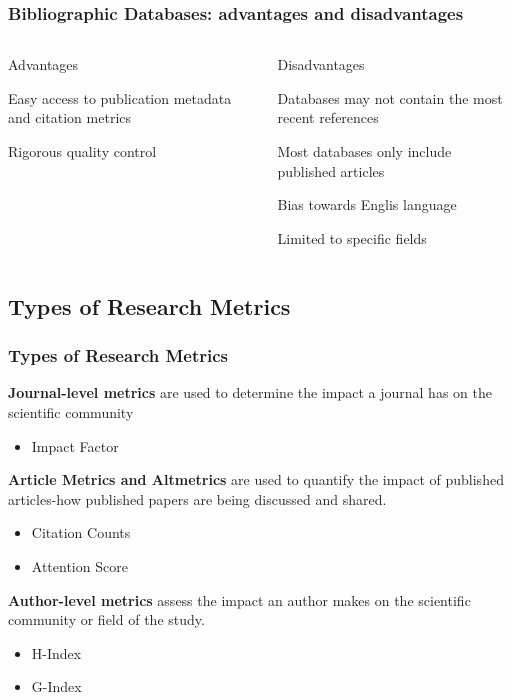 \documentclass{beamer}
\begin{document}
\begin{frame}
    \frametitle{Bibliographic Databases: advantages and disadvantages }
    \begin{columns}[T]
        \begin{column}{.5\textwidth}
            \centering Advantages
            \begin{propslist}
                \item Easy access to publication metadata and citation metrics
                \pause
                \item Rigorous quality control \pause
            \end{propslist}
        \end{column}
        \begin{column}{.5\textwidth}
            \centering Disadvantages %
            \begin{conslist}
                \item Databases may not contain the most recent references \pause
                \item Most databases only include published articles \pause
                \item Bias towards Englis language \pause
                \item Limited to specific fields \pause
            \end{conslist}
        \end{column}
    \end{columns}
\end{frame}
\subsection{Types of Research Metrics}
\begin{frame}
    \frametitle{Types of Research Metrics}
    \textbf{Journal-level metrics} are used to determine the impact a journal has on the scientific community
    \begin{itemize}
        \item Impact Factor
    \end{itemize}
    \textbf{Article Metrics and Altmetrics} are used to quantify the impact of published articles-how published papers are being discussed and shared.
    \begin{itemize}
        \item Citation Counts
        \item Attention Score
    \end{itemize}
    \textbf{Author-level metrics} assess the impact an author makes on the scientific community or field of the study.
    \begin{itemize}
        \item H-Index
        \item G-Index
    \end{itemize}

\end{frame}
\end{document}
